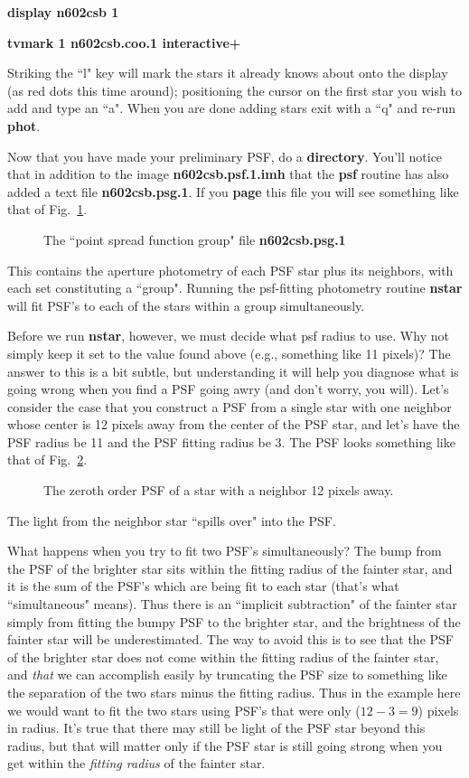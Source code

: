 \centerline{ {\bf display n602csb 1} }
 
\centerline{ {\bf tvmark 1 n602csb.coo.1 interactive+} }
 
\noindent
 
Striking the ``l" key will mark the stars it already knows about onto
the display (as red dots this time around); positioning the cursor on the
first star you wish to add and type an ``a".  When you are done adding
stars exit with a ``q" and re-run {\bf phot}.
 
Now that you have made your preliminary PSF, do a {\bf directory}.  You'll
notice that in addition to the image {\bf n602csb.psf.1.imh} that the
{\bf psf} routine has also added a text file {\bf n602csb.psg.1}.  If
you {\bf page} this file you will see something like that of Fig.~\ref{psg}.
\begin{figure}
\vspace{3.5in}
\caption{\label{psg} The ``point spread function group" file 
{\bf n602csb.psg.1}}
\end{figure}
This contains the aperture photometry of each PSF star plus its neighbors,
with each set constituting a ``group".  Running the psf-fitting photometry
routine {\bf nstar} will fit PSF's to each of the stars within a group
simultaneously.
 
Before we run {\bf nstar}, however, we must decide what psf radius to use.
Why not simply keep it set to the value found above (e.g., something like 11
pixels)?  The answer to this is a bit subtle, but understanding it will
help you diagnose what is going wrong when you find a PSF going awry (and
don't worry, you will).  Let's consider the case that you construct a PSF
from a single star with one neighbor whose center is 12 pixels away from
the center of the PSF star, and let's have the PSF radius be 11 and the PSF
fitting radius be 3. The PSF looks something like that of Fig.~\ref{bump}.
\begin{figure}
\vspace{5.0in}
\caption{\label{bump} The zeroth order PSF of a star with a neighbor 12 pixels
away.}
\end{figure}
The light from the neighbor star ``spills
over" into the PSF. 
 
What happens when you try to fit two PSF's simultaneously?  The bump from the
PSF of the brighter star sits within the fitting radius of the fainter star,
and it is the sum of the PSF's which are being fit to each star (that's
what ``simultaneous" means).  Thus there is an ``implicit subtraction" of
the fainter star simply from fitting the bumpy PSF to the brighter star,
and the brightness of the fainter star will be underestimated.  The way
to avoid this is to see that the PSF of the brighter star does not come
within the fitting radius of the fainter star, and {\it that} we can 
accomplish easily by truncating the PSF size to something like the separation
of the two stars minus the fitting radius.  Thus in the example here
we would want to fit the two stars using PSF's that were only ($12-3=9$)
pixels in radius. It's true that there may still be light of the PSF
star beyond this radius, but that will matter only if the PSF star is still
going strong when you get within the {\it fitting radius} of the fainter
star.  
 
